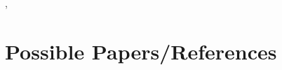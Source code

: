 \documentclass[11pt,letterpaper]{article}
\begin{document}
\citep{dembo2016evolutionary}, \citep{o2016bayesian}


\section{Possible Papers/References}

\citep{halliday2016eutherian}
\citep{halliday2016impact}
\citep{halliday2017resolving}
\citep{halliday2016eutherians}
\citep{beck2014ancient}
\citep{arcila2015evaluation}
\citep{near2004assessing}
\citep{lee2015morphological}
\citep{puttick2016dating}
\citep{pyron2016novel}
\citep{turner2017empirical}
\citep{heath2014fossilized}
\citep{wiens2004role}
\citep{nabhan2011impact}
\citep{dembo2016evolutionary}
\citep{o2016bayesian}




\end{document}
